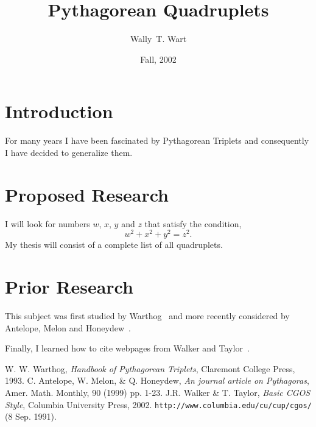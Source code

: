 \documentclass{stprop}
\title{Pythagorean Quadruplets}
\author{Wally~T. Wart}
\date{Fall, 2002}
\begin{document}
\maketitle


\section{Introduction}%
\label{sec:introduction}

For many years I have been fascinated by Pythagorean Triplets
and consequently I have decided to generalize them. 

\section{Proposed Research}%
\label{sec:prop-research}

I will look for numbers $w$, $x$, $y$ and $z$ that satisfy the
condition,
$$w^2+x^2+y^2 =z^2 .$$
My thesis will consist of a complete list of all quadruplets.


\section{Prior Research}%
\label{sec:prior-research}

This subject was first studied by Warthog~\cite{warthog} and more
recently considered by Antelope, Melon and Honeydew~\cite{antelope}.

Finally, I learned how to cite webpages from Walker and
Taylor~\cite{spider}.





\begin{thebibliography}{99} %
 W. W. Warthog, 
                    \emph {Handbook of Pythagorean Triplets},
                    Claremont College Press,
                    1993.
C. Antelope, W. Melon, \& Q. Honeydew,
                \emph {An journal article on Pythagoras},
                 Amer. Math. Monthly,
                 90 (1999) pp. 1-23.
 J.R. Walker \& T. Taylor,
              \emph{Basic CGOS Style}, 
              Columbia University Press, 2002.
              {\tt http://www.columbia.edu/cu/cup/cgos/} 
              (8 Sep. 1991).
\end{thebibliography}



%
\end{document}
